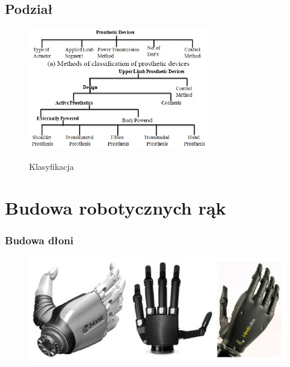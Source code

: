 \documentclass[8pt]{beamer}
\begin{document}
	\subsection{Podział}
		\begin{frame}
			\begin{center}
				\begin{figure}
					\includegraphics[width=0.7\textwidth]{graphics/classification.jpg}
					\label{graph:class}	
					\caption{Klasyfikacja \cite{bandara2012upper}}
				\end{figure}
			\end{center}
		\end{frame}							

\section{Budowa robotycznych rąk}

	
		\begin{frame}
		\frametitle{Budowa dłoni}
			\begin{center}
				\begin{figure}
					\includegraphics[width=\textwidth]{graphics/three_hand.jpg}
					\label{graph:build}	
					\caption{ \cite{6361492}}
				\end{figure}
			\end{center}
		\end{frame}				
\end{document}
